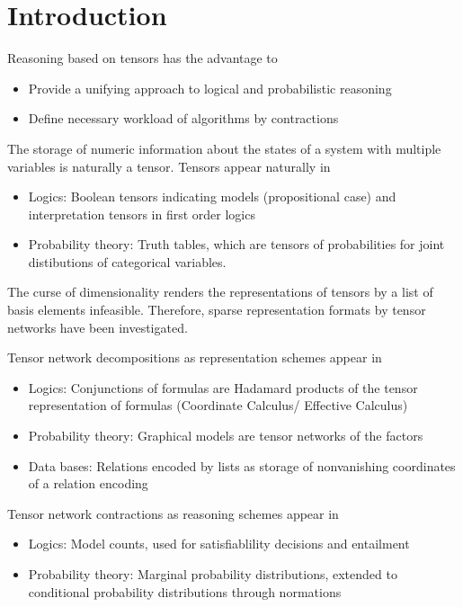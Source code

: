 \section{Introduction}

Reasoning based on tensors has the advantage to
\begin{itemize}
	\item Provide a unifying approach to logical and probabilistic reasoning
	\item Define necessary workload of algorithms by contractions
\end{itemize}

The storage of numeric information about the states of a system with multiple variables is naturally a tensor.
Tensors appear naturally in 
\begin{itemize}
	\item Logics: Boolean tensors indicating models (propositional case) and interpretation tensors in first order logics
	\item Probability theory: Truth tables, which are tensors of probabilities for joint distibutions of categorical variables.
\end{itemize}

The curse of dimensionality renders the representations of tensors by a list of basis elements infeasible.
Therefore, sparse representation formats by tensor networks have been investigated.


Tensor network decompositions as representation schemes appear in
\begin{itemize}
	\item Logics: Conjunctions of formulas are Hadamard products of the tensor representation of formulas (Coordinate Calculus/ Effective Calculus)
	\item Probability theory: Graphical models are tensor networks of the factors
	\item Data bases: Relations encoded by lists as storage of nonvanishing coordinates of a relation encoding
\end{itemize}

Tensor network contractions as reasoning schemes appear in 
\begin{itemize}
	\item Logics: Model counts, used for satisfiablility decisions and entailment
	\item Probability theory: Marginal probability distributions, extended to conditional probability distributions through normations
\end{itemize}




